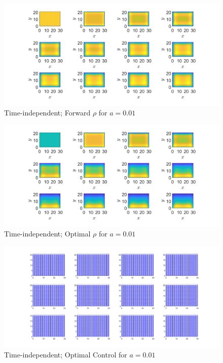 \documentclass[11pt, a4paper]{article}
\theoremstyle{definition}
\begin{document}
		\begin{figure}[h]
		\centering
		\includegraphics[scale=0.35]{C1.png}
		\caption{Time-independent; Forward $\rho$ for $a = 0.01$} 
		\label{F6}
	\end{figure}	
	\begin{figure}[h]
		\centering
		\includegraphics[scale=0.35]{C2.png}
		\caption{Time-independent; Optimal $\rho$ for $a = 0.01$} 
		\label{F7}
	\end{figure}
	\begin{figure}[h]
		\centering
		\includegraphics[scale=0.35]{C3.png}
		\caption{Time-independent; Optimal Control for $a = 0.01$} 
		\label{F8}
	\end{figure}
	
	
	
	
	
\end{document}
